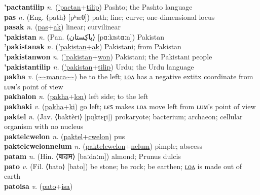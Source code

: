 \textbf{'pactantilip} \textit{n.} (\hyperref['pactan]{'pactan}+\hyperref[tilip]{tilip})
Pashto; the Pashto language \label{'pactantilip} \\
\textbf{pas} \textit{n.} (Eng. ⟨path⟩ [pʰæθ])
path; line; curve; one-dimensional locus \label{pas} \\
\textbf{pasak} \textit{n.} (\hyperref[pas]{pas}+\hyperref[ak]{ak})
linear; curvilinear \label{pasak} \\
\textbf{'pakistan} \textit{n.} (Pan. ⟨پاکِستان‎⟩ [pɑːkɪstɑːn])
Pakistan \label{'pakistan} \\
\textbf{'pakistanak} \textit{n.} (\hyperref['pakistan]{'pakistan}+\hyperref[ak]{ak})
Pakistani; from Pakistan \label{'pakistanak} \\
\textbf{'pakistanwon} \textit{n.} (\hyperref['pakistan]{'pakistan}+\hyperref[won]{won})
Pakistani; the Pakistani people \label{'pakistanwon} \\
\textbf{'pakistantilip} \textit{n.} (\hyperref['pakistan]{'pakistan}+\hyperref[tilip]{tilip})
Urdu; the Urdu language \label{'pakistantilip} \\
\textbf{pakha} \textit{v.} (\hyperref[manca]{\~{}\~{}manca\~{}\~{}})
be to the left; \hyperref[pakhalon]{ʟᴏᴧ} has a negative 	extit{x} coordinate from ʟᴜᴍ's point of view \label{pakha} \\
\textbf{pakhalon} \textit{n.} (\hyperref[pakha]{pakha}+\hyperref[lon]{lon})
left side; to the left \label{pakhalon} \\
\textbf{pakhaki} \textit{v.} (\hyperref[pakha]{pakha}+\hyperref[ki]{ki})
go left; ʟєꜱ makes ʟᴏᴧ move left from ʟᴜᴍ's point of view \label{pakhaki} \\
\textbf{paktel} \textit{n.} (Jav. ⟨baktèri⟩ [pɑ̤ktɛɽi])
prokaryote; bacterium; archaeon; cellular organism with no nucleus \label{paktel} \\
\textbf{paktelcwelon} \textit{n.} (\hyperref[paktel]{paktel}+\hyperref[cwelon]{cwelon})
pus \label{paktelcwelon} \\
\textbf{paktelcwelonnelum} \textit{n.} (\hyperref[paktelcwelon]{paktelcwelon}+\hyperref[nelum]{nelum})
pimple; abscess \label{paktelcwelonnelum} \\
\textbf{patam} \textit{n.} (Hin. ⟨बादाम⟩ [baːdaːm])
almond; Prunus dulcis \label{patam} \\
\textbf{pato} \textit{v.} (Fil. ⟨bato⟩ [bato])
be stone; be rock; be earthen; \hyperref[patolon]{ʟᴏᴧ} is made out of earth \label{pato} \\
\textbf{patoisa} \textit{v.} (\hyperref[pato]{pato}+\hyperref[isa]{isa})
